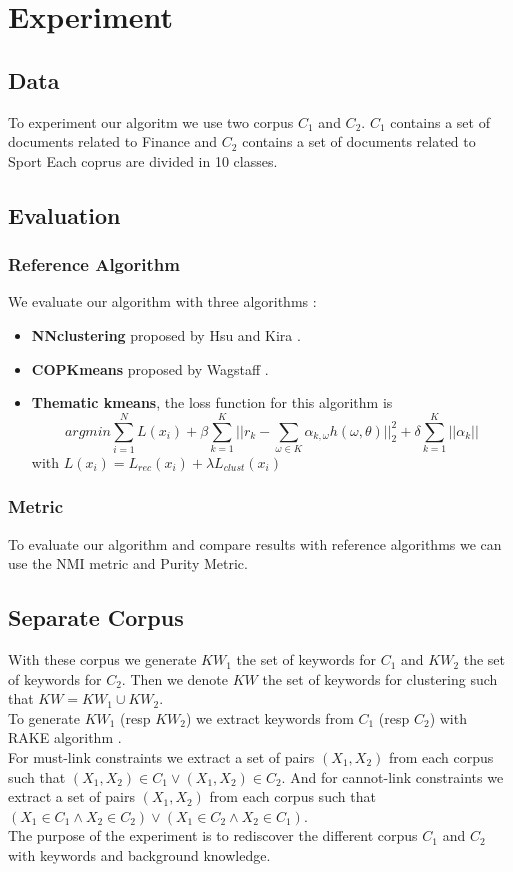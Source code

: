 \section{Experiment}

\subsection{Data}
To experiment our algoritm we use two corpus $C_1$ and $C_2$. $C_1$ contains a
set of documents related to Finance and $C_2$ contains a set of documents
related to Sport Each coprus are divided in 10 classes.

\subsection{Evaluation}
\subsubsection{Reference Algorithm}
We evaluate our algorithm with three algorithms :
\begin{itemize}
\item \textbf{NNclustering} proposed by Hsu and Kira
\cite{2015arXiv151106321H}.
\item \textbf{COPKmeans} proposed by Wagstaff \cite{Wagstaff:2001:CKC:645530.655669}.
\item \textbf{Thematic kmeans}, the loss function for this algorithm is
  \begin{equation*}
    argmin \sum_{i=1}^{N}L(x_i) + \beta\sum_{k=1}^{K}||r_k - \sum_{\omega \in K}
    \alpha_{k,\omega}h(\omega, \theta)||_2^2 + \delta\sum_{k=1}^{K}||\alpha_k|| 
  \end{equation*}
  with $L(x_i) = L_{rec}(x_i) + \lambda L_{clust}(x_i)$
\end{itemize}
\subsubsection{Metric}
To evaluate our algorithm and compare results with reference algorithms we can
use the NMI metric and Purity Metric.

\subsection{Separate Corpus }
With these corpus we generate $KW_1$ the set of keywords
for $C_1$ and $KW_2$ the set of keywords for $C_2$. Then we denote $KW$
the set of keywords for clustering such that $KW = KW_1 \cup KW_2$.\\
To generate $KW_1$ (resp $KW_2$) we extract keywords from $C_1$ (resp $C_2$)
with RAKE algorithm \cite{rake}.\\
For must-link constraints we extract a set of pairs $(X_1, X_2)$ from each
corpus such that $(X_1, X_2) \in C_1 \vee (X_1, X_2) \in C_2$.
And for cannot-link constraints we extract a set of pairs $(X_1, X_2)$ from
each corpus such that $(X_1 \in C_1 \wedge  X_2 \in C_2)\vee (X_1 \in C_2 \wedge
X_2 \in C_1)$.\\
The purpose of the experiment is to rediscover the different corpus $C_1$ and
$C_2$ with keywords and background knowledge.
